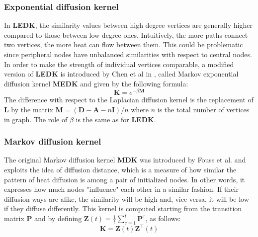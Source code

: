 \subsubsection{Exponential diffusion kernel}
In \textbf{LEDK}, the similarity values between high degree vertices are generally higher compared to those between low degree ones. Intuitively, the more paths connect two vertices, the more heat can flow between them. This could be problematic since peripheral nodes have unbalanced similarities with respect to central nodes. In order to make the strength of individual vertices comparable, a modified version of \textbf{LEDK} is introduced by Chen et al in \cite{chen2014disease}, called Markov exponential diffusion kernel \textbf{MEDK} and given by the following formula:
\begin{equation} \label{MEDK-formula}
\textbf{K} = e^{-\beta \textbf{M}}
\end{equation}
The difference with respect to the Laplacian diffusion kernel is the replacement of \textbf{L} by the matrix $\textbf{M}=(\textbf{D}-\textbf{A}-n\textbf{I})/n$ where $n$ is the total number of vertices in graph. The role of $\beta$ is the same as for \textbf{LEDK}.
\subsubsection{Markov diffusion kernel}
The original Markov diffusion kernel \textbf{MDK} was introduced by Fouss et al. \cite{fouss2006experimental} and exploits the idea of diffusion distance, which is a measure of how similar the pattern of heat diffusion is among a pair of initialized nodes. In other words, it expresses how much nodes "influence" each other in a similar fashion. If their diffusion ways are alike, the similarity will be high and, vice versa, it will be low if they diffuse differently. This kernel is computed starting from the transition matrix \textbf{P} and by defining $\textbf{Z}(t) = \frac{1}{t}\sum_{\tau=1}^{t}\textbf{P}^{\tau}$, as follows:
\begin{equation} 
\label{MDK-formula}
\textbf{K} = \textbf{Z}(t)\textbf{Z}^{\top}(t)
\end{equation}

